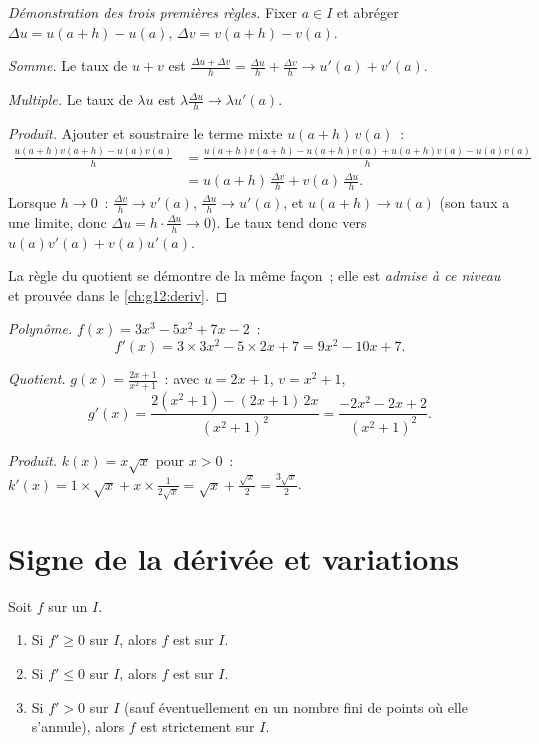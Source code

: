 \begin{proof}[Démonstration des trois premières règles]
Fixer $a \in I$ et abréger $\Delta u = u(a+h) - u(a)$,
$\Delta v = v(a+h) - v(a)$.

\emph{Somme.} Le taux de $u + v$ est
$\frac{\Delta u + \Delta v}{h} = \frac{\Delta u}{h} + \frac{\Delta v}{h}
\to u'(a) + v'(a)$.

\emph{Multiple.} Le taux de $\lambda u$ est
$\lambda \frac{\Delta u}{h} \to \lambda u'(a)$.

\emph{Produit.} Ajouter et soustraire le terme mixte $u(a+h)\,v(a)$~:
\begin{align*}
\frac{u(a+h)v(a+h) - u(a)v(a)}{h}
&= \frac{u(a+h)v(a+h) - u(a+h)v(a) + u(a+h)v(a) - u(a)v(a)}{h}\\
&= u(a+h)\,\frac{\Delta v}{h} + v(a)\,\frac{\Delta u}{h}.
\end{align*}
Lorsque $h \to 0$~: $\frac{\Delta v}{h} \to v'(a)$,
$\frac{\Delta u}{h} \to u'(a)$, et $u(a+h) \to u(a)$ (son taux a une
limite, donc $\Delta u = h \cdot \frac{\Delta u}{h} \to 0$). Le taux
tend donc vers $u(a)v'(a) + v(a)u'(a)$.

La règle du quotient se démontre de la même façon~; elle est
\emph{admise à ce niveau} et prouvée dans le \cref{ch:g12:deriv}.
\end{proof}

\begin{example}\label{ex:g11:deriv:computations}
\emph{Polynôme.} $f(x) = 3x^3 - 5x^2 + 7x - 2$~:
\[
f'(x) = 3 \times 3x^2 - 5 \times 2x + 7 = 9x^2 - 10x + 7 .
\]

\emph{Quotient.} $g(x) = \frac{2x+1}{x^2+1}$~: avec $u = 2x + 1$,
$v = x^2 + 1$,
\[
g'(x) = \frac{2(x^2+1) - (2x+1)\,2x}{(x^2+1)^2}
= \frac{-2x^2 - 2x + 2}{(x^2+1)^2}.
\]

\emph{Produit.} $k(x) = x\sqrt x$ pour $x > 0$~:
$k'(x) = 1 \times \sqrt x + x \times \frac{1}{2\sqrt x}
= \sqrt x + \frac{\sqrt x}{2} = \frac{3\sqrt x}{2}$.
\end{example}

\section{Signe de la dérivée et variations}

\begin{theorem}\label{thm:g11:deriv:variations}
Soit $f$  sur un  $I$.
\begin{enumerate}
  \item Si $f' \geq 0$ sur $I$, alors $f$ est  sur $I$.
  \item Si $f' \leq 0$ sur $I$, alors $f$ est  sur $I$.
  \item Si $f' > 0$ sur $I$ (sauf éventuellement en un nombre fini de
        points où elle s'annule), alors $f$ est strictement 
        sur $I$.
\end{enumerate}
\end{theorem}

